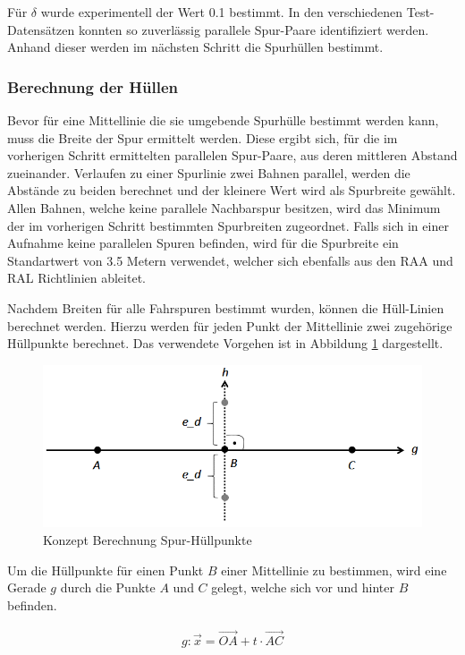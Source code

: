 Für $\delta$ wurde experimentell der Wert 0.1 bestimmt. In den verschiedenen Test-Datensätzen konnten
so zuverlässig parallele Spur-Paare identifiziert werden. Anhand dieser werden im nächsten Schritt
die Spurhüllen bestimmt.

\subsubsection{Berechnung der Hüllen}
\label{sec:real2_create_envelopes}

Bevor für eine Mittellinie die sie umgebende Spurhülle bestimmt werden kann, muss die Breite der Spur
ermittelt werden. Diese ergibt sich, für die im vorherigen Schritt ermittelten parallelen Spur-Paare, aus
deren mittleren Abstand zueinander. Verlaufen zu einer Spurlinie zwei Bahnen parallel, werden
die Abstände zu beiden berechnet und der kleinere Wert wird als Spurbreite gewählt.
Allen Bahnen, welche keine parallele Nachbarspur besitzen, wird das Minimum der im vorherigen Schritt
bestimmten Spurbreiten zugeordnet.
Falls sich in einer Aufnahme keine parallelen Spuren befinden, wird für die Spurbreite ein Standartwert
von 3.5 Metern verwendet, welcher sich ebenfalls aus den RAA und RAL Richtlinien ableitet.

Nachdem Breiten für alle Fahrspuren bestimmt wurden, können die Hüll-Linien berechnet werden.
Hierzu werden für jeden Punkt der Mittellinie zwei zugehörige Hüllpunkte berechnet.
Das verwendete Vorgehen ist in Abbildung \ref{fig:real2_envelope_point_calculation_concept} dargestellt.

\begin{figure}[H]
    \centering
    \includegraphics[width=0.5\linewidth]{resources/img/umsetzung/U2/calc_env_point}
    \caption{Konzept Berechnung Spur-Hüllpunkte}
    \label{fig:real2_envelope_point_calculation_concept}
\end{figure}

Um die Hüllpunkte für einen Punkt $B$ einer Mittellinie zu bestimmen, wird eine Gerade $g$ durch die
Punkte $A$ und $C$ gelegt, welche sich vor und hinter $B$ befinden.

\begin{ceqn}
\begin{align}
    g: \vec{x} = \overrightarrow{OA} + t \cdot \overrightarrow{AC}
\end{align}
\end{ceqn}


